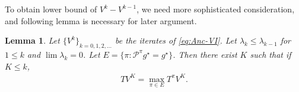 \documentclass{article} %
\newcommand{\cP}{\mathcal{P}}
\newcommand*{\para}[1]{\left({#1}\right)}
\newcommand*{\infn}[1]{\left\|{#1}\right\|_{\infty}}
\newtheorem{lemma}{Lemma}
\begin{document}
To obtain lower bound of $V^{k}-V^{k-1}$, we need more sophisticated consideration, and following lemma is necessary for later argument.
\begin{lemma}\label{lem::opt_policy_cond}
Let $\{V^k\}_{k=0, 1,2,\dots}$ be the iterates of \ref{eq:Anc-VI}.  Let $\lambda_k \le \lambda_{k-1}$ for $1 \le k$ and $\lim \lambda_k = 0$.  Let $E = \{\pi: \cP^{\pi}g^{\star}= g^{\star}\}$. Then there exist $K$  such that if $K \le k$,
    \begin{align*}
        TV^K=\max_{\pi \in E}T^{\pi}V^K. 
    \end{align*}
\end{lemma}
\end{document}
